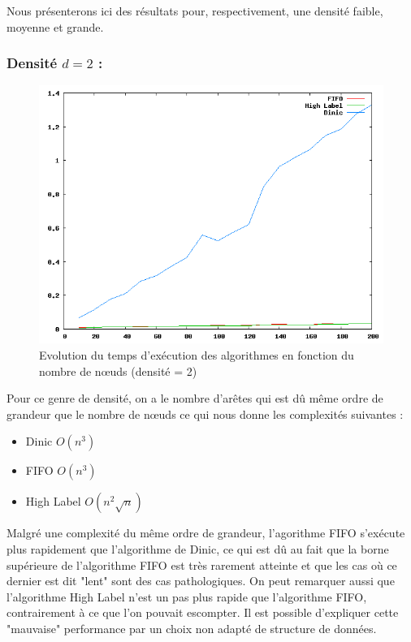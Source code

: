 Nous présenterons ici des résultats pour, respectivement, une densité faible, moyenne et grande.\\

\subsubsection{Densité $d = 2$ :}

\begin{figure}
\begin{center}
\includegraphics[scale=0.6]{../data_struct/results/ratio2.png}
\end{center}
\caption{Evolution du temps d'exécution des algorithmes en fonction du nombre de n\oe uds (densité =
2)}
\label{d2}
\end{figure}

Pour ce genre de densité, on a le nombre d'arêtes qui est dû même ordre de grandeur que le nombre de
n\oe uds ce qui nous donne les complexités suivantes :
\begin{itemize}
\item Dinic $O(n^3)$
\item FIFO $O(n^3)$
\item High Label $O(n^2\sqrt{n})$
\end{itemize}

Malgré une complexité du même ordre de grandeur, l'agorithme FIFO s'exécute plus rapidement que
l'algorithme de Dinic, ce qui est dû au fait que la borne supérieure de l'algorithme FIFO est très
rarement atteinte et que les cas où ce dernier est dit "lent" sont des cas pathologiques. On peut
remarquer aussi que l'algorithme High Label n'est un pas plus rapide que l'algorithme FIFO,
contrairement à ce que l'on pouvait escompter. Il est possible d'expliquer cette "mauvaise"
performance par un choix non adapté de structure de données.

